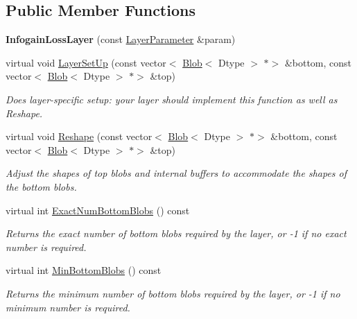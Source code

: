 \subsection*{Public Member Functions}
\begin{DoxyCompactItemize}
\item 
\mbox{\label{classcaffe_1_1_infogain_loss_layer_ac2269ba8dc7d18fa8fab90ea9f295784}} 
{\bfseries Infogain\+Loss\+Layer} (const \mbox{\hyperlink{classcaffe_1_1_layer_parameter}{Layer\+Parameter}} \&param)
\item 
virtual void \mbox{\hyperlink{classcaffe_1_1_infogain_loss_layer_a772be3f4074c72b3cf9214bda3422402}{Layer\+Set\+Up}} (const vector$<$ \mbox{\hyperlink{classcaffe_1_1_blob}{Blob}}$<$ Dtype $>$ $\ast$$>$ \&bottom, const vector$<$ \mbox{\hyperlink{classcaffe_1_1_blob}{Blob}}$<$ Dtype $>$ $\ast$$>$ \&top)
\begin{DoxyCompactList}\small\item\em Does layer-\/specific setup\+: your layer should implement this function as well as Reshape. \end{DoxyCompactList}\item 
virtual void \mbox{\hyperlink{classcaffe_1_1_infogain_loss_layer_a83ed478450bc7f629499fed37f654c5c}{Reshape}} (const vector$<$ \mbox{\hyperlink{classcaffe_1_1_blob}{Blob}}$<$ Dtype $>$ $\ast$$>$ \&bottom, const vector$<$ \mbox{\hyperlink{classcaffe_1_1_blob}{Blob}}$<$ Dtype $>$ $\ast$$>$ \&top)
\begin{DoxyCompactList}\small\item\em Adjust the shapes of top blobs and internal buffers to accommodate the shapes of the bottom blobs. \end{DoxyCompactList}\item 
virtual int \mbox{\hyperlink{classcaffe_1_1_infogain_loss_layer_aa03732f381764180748479c83b289869}{Exact\+Num\+Bottom\+Blobs}} () const
\begin{DoxyCompactList}\small\item\em Returns the exact number of bottom blobs required by the layer, or -\/1 if no exact number is required. \end{DoxyCompactList}\item 
virtual int \mbox{\hyperlink{classcaffe_1_1_infogain_loss_layer_ad8a1ef702a695e379e5d0450369b4a0c}{Min\+Bottom\+Blobs}} () const
\begin{DoxyCompactList}\small\item\em Returns the minimum number of bottom blobs required by the layer, or -\/1 if no minimum number is required. \end{DoxyCompactList}\item 

\end{DoxyCompactItemize}
